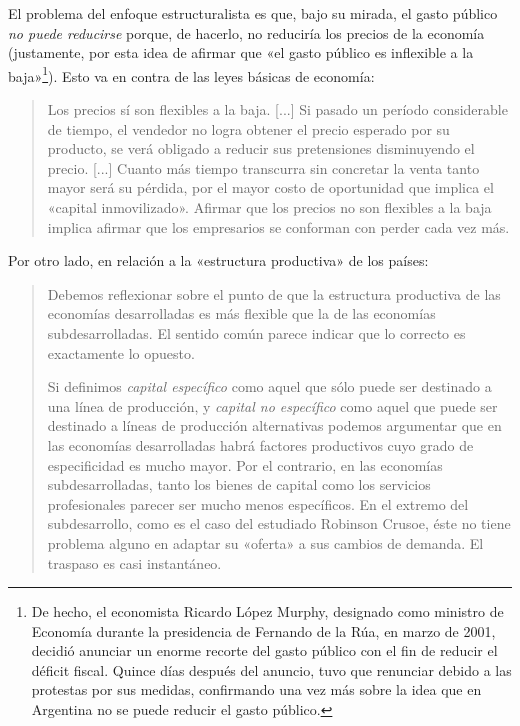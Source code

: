 \documentclass[12pt,a4paper,twoside]{book}
\begin{document}
El problema del enfoque estructuralista es que, bajo su mirada, el gasto público  \textit{no puede reducirse} porque, de hacerlo, no reduciría los precios de la economía (justamente, por esta idea de afirmar que «el gasto público es inflexible a la baja»\footnote{De hecho, el economista Ricardo López Murphy, designado como ministro de Economía durante la presidencia de Fernando de la Rúa, en marzo de 2001, decidió anunciar un enorme recorte del gasto público con el fin de reducir el déficit fiscal. Quince días después del anuncio, tuvo que renunciar debido a las protestas por sus medidas, confirmando una vez más sobre la idea que en Argentina no se puede reducir el gasto público.}). Esto va en contra de las leyes básicas de economía:

\begin{quotation}
Los precios sí son flexibles a la baja. [...] Si pasado un período considerable de tiempo, el vendedor no logra obtener el precio esperado por su producto, se verá obligado a reducir sus pretensiones disminuyendo el precio. [...] Cuanto más tiempo transcurra sin concretar la venta tanto mayor será su pérdida, por el mayor costo de oportunidad que implica el «capital inmovilizado». Afirmar que los precios no son flexibles a la baja implica afirmar que los empresarios se conforman con perder cada vez más. \cite[pág. 467]{elementos-econopol}
\end{quotation}

Por otro lado, en relación a la «estructura productiva» de los países:

\begin{quotation}
Debemos reflexionar sobre el punto de que la estructura productiva de las economías desarrolladas es más flexible que la de las economías subdesarrolladas. El sentido común parece indicar que lo correcto es exactamente lo opuesto.

Si definimos \textit{capital específico} como aquel que sólo puede ser destinado a una línea de producción, y \textit{capital no específico} como aquel que puede ser destinado a líneas de producción alternativas podemos argumentar que en las economías desarrolladas habrá factores productivos cuyo grado de especificidad es mucho mayor. Por el contrario, en las economías subdesarrolladas, tanto los bienes de capital como los servicios profesionales parecer ser mucho menos específicos. En el extremo del subdesarrollo, como es el caso del estudiado Robinson Crusoe, éste no tiene problema alguno en adaptar su «oferta» a sus cambios de demanda. El traspaso es casi instantáneo. \cite[pág. 468]{elementos-econopol}
\end{quotation}
\end{document}
